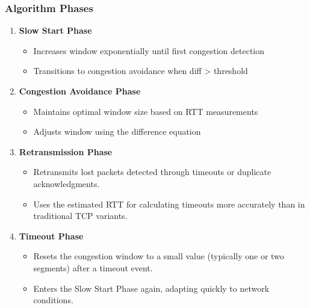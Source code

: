 \documentclass[11pt,a4paper]{article}
\begin{document}
\begin{tcolorbox}[
    enhanced,
    colback=white,
    colframe=blue!75!black,
    title=Algorithm Phases]
    
\subsubsection{Algorithm Phases}
\begin{enumerate}
    \item \textbf{Slow Start Phase}
    \begin{itemize}
        \item Increases window exponentially until first congestion detection
        \item Transitions to congestion avoidance when diff > threshold
    \end{itemize}
    
    \item \textbf{Congestion Avoidance Phase}
    \begin{itemize}
        \item Maintains optimal window size based on RTT measurements
        \item Adjusts window using the difference equation
    \end{itemize}
\item \textbf{Retransmission Phase}
\begin{itemize}
    \item Retransmits lost packets detected through timeouts or duplicate acknowledgments.
    \item Uses the estimated RTT for calculating timeouts more accurately than in traditional TCP variants.
\end{itemize}

\item \textbf{Timeout Phase}
\begin{itemize}
    \item Resets the congestion window to a small value (typically one or two segments) after a timeout event.
    \item Enters the Slow Start Phase again, adapting quickly to network conditions.
\end{itemize}

\end{enumerate}
\end{tcolorbox}

\end{document}
